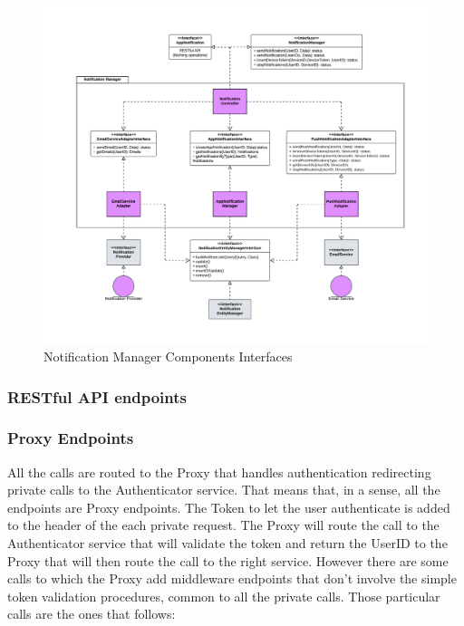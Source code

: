 \begin{figure}[H]
    \centering
    \includegraphics[width=\linewidth]{Latex/Images/DD/Interfaces2.png}
    \caption{Notification Manager Components Interfaces}
    \label{fig:notifyinterfaces}
\end{figure}
\subsubsection{RESTful API endpoints}
\subsubsection*{Proxy Endpoints}
All the calls are routed to the Proxy that handles authentication
redirecting private calls to the Authenticator service. That means that,
in a sense, all the endpoints are Proxy endpoints. The Token to let the user authenticate is added to the header of
the each private request. The Proxy will route the call to the
Authenticator service that will validate the token and return the UserID
to the Proxy that will then route the call to the right service.
However there are some calls to which the Proxy add middleware endpoints that don't
involve the simple token validation procedures, common to all the private
calls. Those particular calls are the ones that follows:\\

